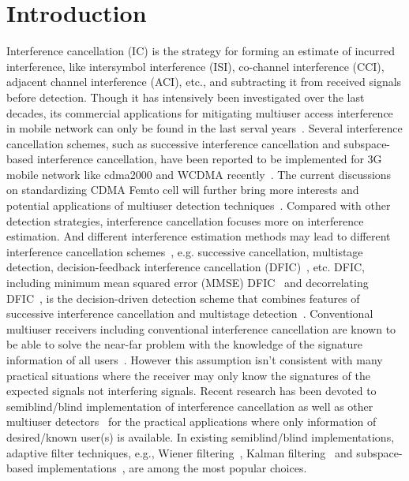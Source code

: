 \documentclass[conference]{IEEEtran}
\begin{document}
\section{Introduction}
Interference cancellation (IC) is the strategy for forming an
estimate of incurred interference, like intersymbol interference
(ISI), co-channel interference (CCI), adjacent channel
interference (ACI), etc., and subtracting it from received signals
before detection. Though it has intensively been investigated over
the last decades, its commercial applications for mitigating
multiuser access interference in mobile network can only be found
in the last serval years~\cite{Andr05}. Several interference
cancellation schemes, such as successive interference cancellation
and subspace-based interference cancellation, have been reported
to be implemented for 3G mobile network like cdma2000 and WCDMA
recently~\cite{Wang05C}. The current discussions on standardizing
CDMA Femto cell will further bring more interests and potential
applications of multiuser detection techniques~\cite{Air07,LGT07}.
Compared with other detection strategies, interference
cancellation focuses more on interference estimation. And
different interference estimation methods may lead to different
interference cancellation schemes~\cite{Verd98,Wang02b}, e.g.
successive cancellation, multistage detection, decision-feedback
interference cancellation (DFIC)~\cite{Kave85,Duel95}, etc. DFIC,
including minimum mean squared error (MMSE) DFIC~\cite{Kave85} and
decorrelating DFIC~\cite{Duel95}, is the decision-driven detection
scheme that combines features of successive interference
cancellation and multistage detection~\cite{Verd98}. Conventional
multiuser receivers including conventional interference
cancellation are known to be able to solve the near-far problem
with the knowledge of the signature information of all
users~\cite{Verd98}. However this assumption isn't consistent with
many practical situations where the receiver may only know the
signatures of the expected signals not interfering signals. Recent
research has been devoted to semiblind/blind implementation of
interference cancellation as well as other multiuser
detectors~\cite{Madh94,Wang98,Zhang02,Wang03d,Wang05A} for the
practical applications where only information of desired/known
user(s) is available. In existing semiblind/blind implementations,
adaptive filter techniques, e.g., Wiener filtering~\cite{Madh94},
Kalman filtering~\cite{Zhang02} and subspace-based
implementations~\cite{Wang98}, are among the most popular choices.
\end{document}
